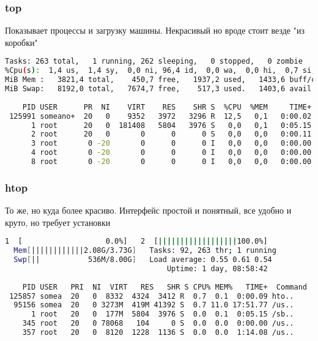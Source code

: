 \documentclass[11pt]{article}
\begin{document}
\subsubsection{top}
Показывает процессы и загрузку машины. Некрасивый но вроде стоит везде "из коробки"
\begin{lstlisting}[language=bash]
Tasks: 263 total,   1 running, 262 sleeping,   0 stopped,   0 zombie        
%Cpu(s):  1,4 us,  1,4 sy,  0,0 ni, 96,4 id,  0,0 wa,  0,0 hi,  0,7 si,  0  
MiB Mem :   3821,4 total,    450,7 free,   1937,2 used,   1433,6 buff/cach  
MiB Swap:   8192,0 total,   7674,7 free,    517,3 used.   1403,6 avail Mem  
                                                                            
    PID USER      PR  NI    VIRT    RES    SHR S  %CPU  %MEM     TIME+      
 125991 someano+  20   0    9352   3972   3296 R  12,5   0,1   0:00.02      
      1 root      20   0  181408   5804   3976 S   0,0   0,1   0:05.15      
      2 root      20   0       0      0      0 S   0,0   0,0   0:00.11      
      3 root       0 -20       0      0      0 I   0,0   0,0   0:00.00      
      4 root       0 -20       0      0      0 I   0,0   0,0   0:00.00      
      8 root       0 -20       0      0      0 I   0,0   0,0   0:00.00    
\end{lstlisting}
\subsubsection{htop}
То же, но куда более красиво. Интерфейс простой и понятный, все удобно и круто, но требует установки
\begin{lstlisting}[language=bash]
  1  [                   0.0%]   2  [||||||||||||||||||100.0%]       
  Mem[||||||||||||2.08G/3.73G]   Tasks: 92, 263 thr; 1 running          
  Swp[||           536M/8.00G]   Load average: 0.55 0.61 0.54           
                                     Uptime: 1 day, 08:58:42                
                                                                            
    PID USER   PRI  NI  VIRT   RES   SHR S CPU% MEM%   TIME+  Command    
 125857 somea  20   0  8332  4324  3412 R  0.7  0.1  0:00.09 hto..       
  95156 somea  20   0 3273M  419M 41392 S  0.7 11.0 17:51.77 /us..
      1 root   20   0  177M  5804  3976 S  0.0  0.1  0:05.15 /sb.. 
    345 root   20   0 78068   104     0 S  0.0  0.0  0:00.00 /us.. 
    357 root   20   0  8120  1228  1136 S  0.0  0.0  1:14.08 /us..
\end{lstlisting}
\end{document}
